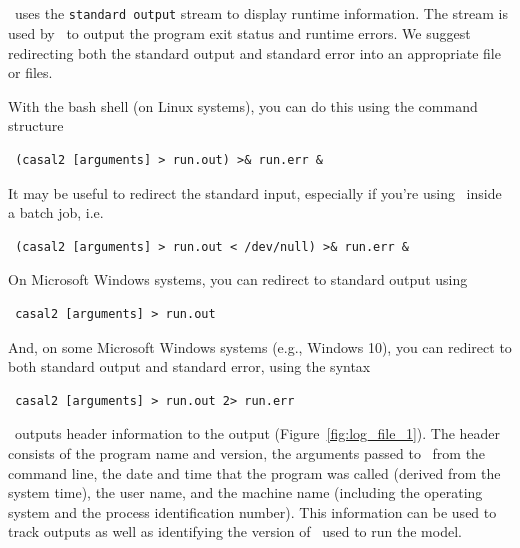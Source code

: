 \subsection{\label{sec:RedirectingStandardOut}}

\CNAME\ uses the \texttt{standard output} stream to display runtime information. The  stream is used by \CNAME\ to output the program exit status and runtime errors. We suggest redirecting both the standard output and standard error into an appropriate file or files.

With the bash shell (on Linux systems), you can do this using the command structure

\begin{verbatim} (casal2 [arguments] > run.out) >& run.err &\end{verbatim}

It may be useful to redirect the standard input, especially if you're using \CNAME\ inside a batch job, i.e.

\begin{verbatim} (casal2 [arguments] > run.out < /dev/null) >& run.err &\end{verbatim}

On Microsoft Windows systems, you can redirect to standard output using

\begin{verbatim} casal2 [arguments] > run.out\end{verbatim}

And, on some Microsoft Windows systems (e.g., Windows 10), you can redirect to both standard output and standard error, using the syntax

\begin{verbatim} casal2 [arguments] > run.out 2> run.err\end{verbatim}

\CNAME\ outputs header information to the output (Figure~\ref{fig:log_file_1}). The header consists of the program name and version, the arguments passed to \CNAME\ from the command line, the date and time that the program was called (derived from the system time), the user name, and the machine name (including the operating system and the process identification number). This information can be used to track outputs as well as identifying the version of \CNAME\ used to run the model.

